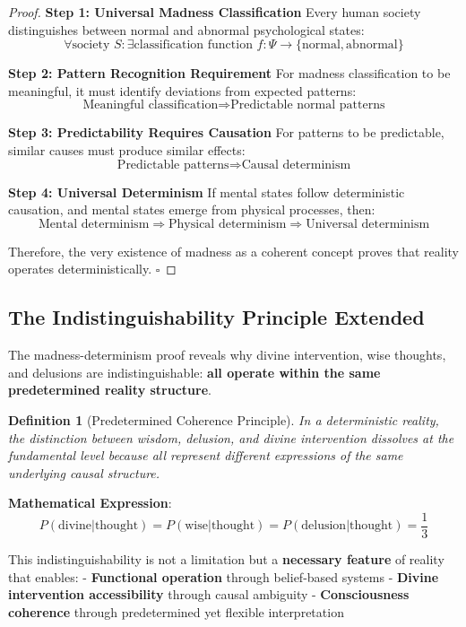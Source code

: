 \documentclass[12pt,a4paper]{article}
\newtheorem{definition}[theorem]{Definition}
\begin{document}
\begin{proof}
\textbf{Step 1: Universal Madness Classification}
Every human society distinguishes between normal and abnormal psychological states:
$$\forall \text{society } S: \exists \text{classification function } f: \Psi \rightarrow \{\text{normal}, \text{abnormal}\}$$

\textbf{Step 2: Pattern Recognition Requirement}
For madness classification to be meaningful, it must identify deviations from expected patterns:
$$\text{Meaningful classification} \Rightarrow \text{Predictable normal patterns}$$

\textbf{Step 3: Predictability Requires Causation}
For patterns to be predictable, similar causes must produce similar effects:
$$\text{Predictable patterns} \Rightarrow \text{Causal determinism}$$

\textbf{Step 4: Universal Determinism}
If mental states follow deterministic causation, and mental states emerge from physical processes, then:
$$\text{Mental determinism} \Rightarrow \text{Physical determinism} \Rightarrow \text{Universal determinism}$$

Therefore, the very existence of madness as a coherent concept proves that reality operates deterministically. $\square$
\end{proof}

\subsection{The Indistinguishability Principle Extended}

The madness-determinism proof reveals why divine intervention, wise thoughts, and delusions are indistinguishable: \textbf{all operate within the same predetermined reality structure}.

\begin{definition}[Predetermined Coherence Principle]
In a deterministic reality, the distinction between wisdom, delusion, and divine intervention dissolves at the fundamental level because all represent different expressions of the same underlying causal structure.
\end{definition}

\textbf{Mathematical Expression}:
$$P(\text{divine}|\text{thought}) = P(\text{wise}|\text{thought}) = P(\text{delusion}|\text{thought}) = \frac{1}{3}$$

This indistinguishability is not a limitation but a \textbf{necessary feature} of reality that enables:
- \textbf{Functional operation} through belief-based systems
- \textbf{Divine intervention accessibility} through causal ambiguity
- \textbf{Consciousness coherence} through predetermined yet flexible interpretation
\end{document}

